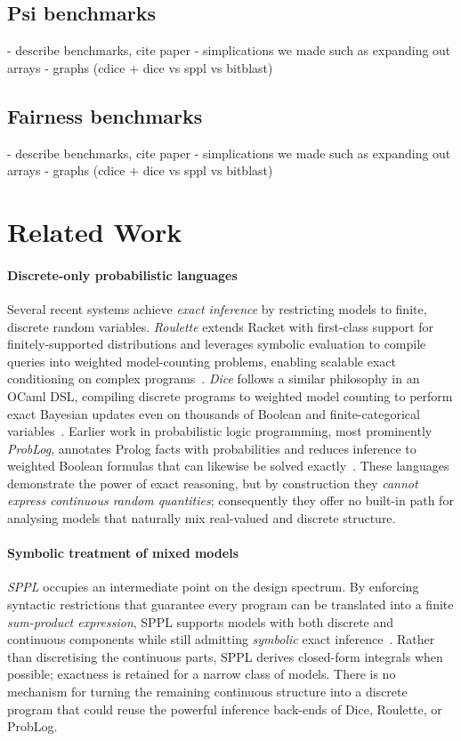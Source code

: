 \documentclass[acmsmall,screen,dvipsnames,x11names,nonacm,anonymous,review]{acmart}
\begin{document}
\subsection{Psi benchmarks}
- describe benchmarks, cite paper
- simplications we made such as expanding out arrays
- graphs (cdice + dice vs sppl vs bitblast)

\subsection{Fairness benchmarks}
- describe benchmarks, cite paper
- simplications we made such as expanding out arrays
- graphs (cdice + dice vs sppl vs bitblast)





\section{Related Work}
\label{sec:related}

\paragraph{Discrete-only probabilistic languages}  
Several recent systems achieve \emph{exact inference} by restricting models to finite, discrete random variables. \emph{Roulette} extends Racket with first-class support for finitely-supported distributions and leverages symbolic evaluation to compile queries into weighted model-counting problems, enabling scalable exact conditioning on complex programs~\cite{Moy2025Roulette}. \emph{Dice} follows a similar philosophy in an OCaml DSL, compiling discrete programs to weighted model counting to perform exact Bayesian updates even on thousands of Boolean and finite-categorical variables~\cite{Holtzen2020Dice}. Earlier work in probabilistic logic programming, most prominently \emph{ProbLog}, annotates Prolog facts with probabilities and reduces inference to weighted Boolean formulas that can likewise be solved exactly~\cite{DeRaedt2007ProbLog}. These languages demonstrate the power of exact reasoning, but by construction they \emph{cannot express continuous random quantities}; consequently they offer no built-in path for analysing models that naturally mix real-valued and discrete structure.  

\paragraph{Symbolic treatment of mixed models}  
\emph{SPPL} occupies an intermediate point on the design spectrum. By enforcing syntactic restrictions that guarantee every program can be translated into a finite \emph{sum-product expression}, SPPL supports models with both discrete and continuous components while still admitting \emph{symbolic} exact inference~\cite{Saad2021SPPL}. Rather than discretising the continuous parts, SPPL derives closed-form integrals when possible; exactness is retained for a narrow class of models. There is no mechanism for turning the remaining continuous structure into a discrete program that could reuse the powerful inference back-ends of Dice, Roulette, or ProbLog.
\end{document}
